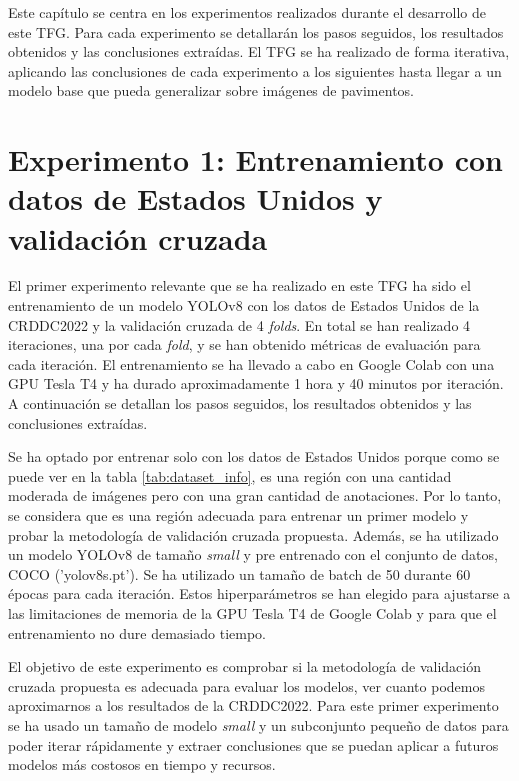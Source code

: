 
Este capítulo se centra en los experimentos realizados durante el desarrollo de este TFG. Para cada experimento se detallarán los pasos seguidos, los resultados obtenidos y las conclusiones extraídas. El TFG se ha realizado de forma iterativa, aplicando las conclusiones de cada experimento a los siguientes hasta llegar a un modelo base que pueda generalizar sobre imágenes de pavimentos.


\section{Experimento 1: Entrenamiento con datos de Estados Unidos y validación cruzada}\label{SEC:EXP1}

El primer experimento relevante que se ha realizado en este TFG ha sido el entrenamiento de un modelo YOLOv8 con los datos de Estados Unidos de la CRDDC2022 y la validación cruzada de 4 \textit{folds}. En total se han realizado 4 iteraciones, una por cada \textit{fold}, y se han obtenido métricas de evaluación para cada iteración. El entrenamiento se ha llevado a cabo en Google Colab con una GPU Tesla T4 y ha durado aproximadamente 1 hora y 40 minutos por iteración. A continuación se detallan los pasos seguidos, los resultados obtenidos y las conclusiones extraídas.

Se ha optado por entrenar solo con los datos de Estados Unidos porque como se puede ver en la tabla \ref{tab:dataset_info}, es una región con una cantidad moderada de imágenes pero con una gran cantidad de anotaciones. Por lo tanto, se considera que es una región adecuada para entrenar un primer modelo y probar la metodología de validación cruzada propuesta. Además, se ha utilizado un modelo YOLOv8 de tamaño \textit{small} y pre entrenado con el conjunto de datos, COCO ('yolov8s.pt'). Se ha utilizado un tamaño de batch de 50 durante 60 épocas para cada iteración. Estos hiperparámetros se han elegido para ajustarse a las limitaciones de memoria de la GPU Tesla T4 de Google Colab y para que el entrenamiento no dure demasiado tiempo. 

El objetivo de este experimento es comprobar si la metodología de validación cruzada propuesta es adecuada para evaluar los modelos, ver cuanto podemos aproximarnos a los resultados de la CRDDC2022. Para este primer experimento se ha usado un tamaño de modelo \textit{small} y un subconjunto pequeño de datos para poder iterar rápidamente y extraer conclusiones que se puedan aplicar a futuros modelos más costosos en tiempo y recursos.

